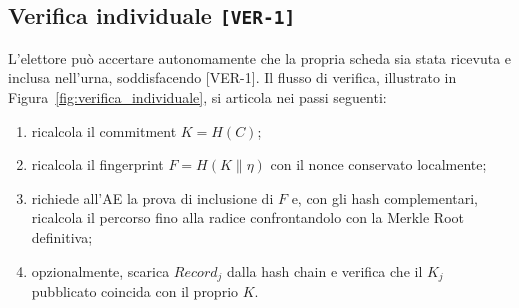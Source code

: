 \subsection{Verifica individuale \texttt{[VER-1]}}
\label{subsec:wp2_verifica_individuale}

L'elettore può accertare autonomamente che la propria scheda sia stata ricevuta e inclusa nell'urna, soddisfacendo [VER-1]. Il flusso di verifica, illustrato in Figura~\ref{fig:verifica_individuale}, si articola nei passi seguenti:
\begin{enumerate}
    \item ricalcola il commitment $K = H(C)$;
    \item ricalcola il fingerprint $F = H(K \parallel \eta)$ con il nonce conservato localmente;
    \item richiede all'AE la prova di inclusione di $F$ e, con gli hash complementari, ricalcola il percorso fino alla radice confrontandolo con la Merkle Root definitiva;
    \item opzionalmente, scarica $Record_j$ dalla hash chain e verifica che il $K_j$ pubblicato coincida con il proprio $K$.
\end{enumerate}

